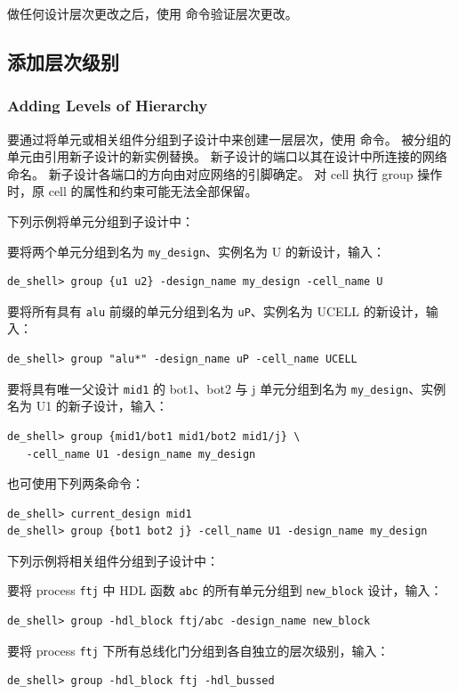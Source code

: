 做任何设计层次更改之后，使用  命令验证层次更改。

\subsection{添加层次级别}
\subsubsection*{Adding Levels of Hierarchy}

要通过将单元或相关组件分组到子设计中来创建一层层次，使用  命令。
被分组的单元由引用新子设计的新实例替换。
新子设计的端口以其在设计中所连接的网络命名。
新子设计各端口的方向由对应网络的引脚确定。
对 cell 执行 group 操作时，原 cell 的属性和约束可能无法全部保留。

下列示例将单元分组到子设计中：

要将两个单元分组到名为 \texttt{my\_design}、实例名为 U 的新设计，输入：
\begin{lstlisting}
de_shell> group {u1 u2} -design_name my_design -cell_name U
\end{lstlisting}

要将所有具有 \texttt{alu} 前缀的单元分组到名为 \texttt{uP}、实例名为 UCELL 的新设计，输入：
\begin{lstlisting}
de_shell> group "alu*" -design_name uP -cell_name UCELL
\end{lstlisting}

要将具有唯一父设计 \texttt{mid1} 的 bot1、bot2 与 j 单元分组到名为 \texttt{my\_design}、实例名为 U1 的新子设计，输入：
\begin{lstlisting}
de_shell> group {mid1/bot1 mid1/bot2 mid1/j} \
   -cell_name U1 -design_name my_design
\end{lstlisting}

也可使用下列两条命令：
\begin{lstlisting}
de_shell> current_design mid1
de_shell> group {bot1 bot2 j} -cell_name U1 -design_name my_design
\end{lstlisting}

下列示例将相关组件分组到子设计中：

要将 process \texttt{ftj} 中 HDL 函数 \texttt{abc} 的所有单元分组到 \texttt{new\_block} 设计，输入：
\begin{lstlisting}
de_shell> group -hdl_block ftj/abc -design_name new_block
\end{lstlisting}

要将 process \texttt{ftj} 下所有总线化门分组到各自独立的层次级别，输入：
\begin{lstlisting}
de_shell> group -hdl_block ftj -hdl_bussed
\end{lstlisting}

